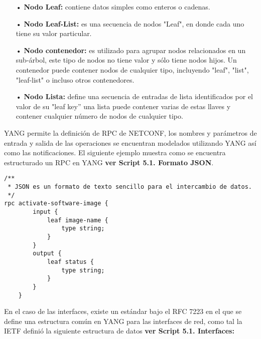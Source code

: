 \begin{itemize}
\item[•] \textbf{Nodo Leaf:} contiene datos simples como enteros o cadenas.
\item[•] \textbf{Nodo Leaf-List:}  es una secuencia de nodos "Leaf", en donde cada uno tiene su valor particular.
\item[•]\textbf{Nodo contenedor:} es utilizado para agrupar nodos relacionados en un sub-árbol, este tipo de nodos no tiene valor y sólo tiene nodos hijos. Un contenedor puede contener nodos de cualquier tipo, incluyendo "leaf", "list", "leaf-list" o incluso otros contenedores.
\item[•] \textbf{Nodo Lista:} define una secuencia de entradas de lista identificados por el valor de su "leaf key” una lista puede contener varias de estas llaves y contener cualquier número de nodos de cualquier tipo.
\end{itemize}
YANG permite la definición de RPC de NETCONF, los nombres y parámetros de entrada y salida de las operaciones se encuentran modelados utilizando YANG así como las notificaciones. El siguiente ejemplo muestra como se encuentra estructurado un RPC en YANG \textbf{ver Script 5.1. Formato JSON}.


\lstset{language=java, caption=RPC Estructura en YANG, label=lst:YANG}
\begin{lstlisting}
/** 
 * JSON es un formato de texto sencillo para el intercambio de datos.  
 */
rpc activate-software-image {
        input {
            leaf image-name {
                type string;
            }
        }
        output {
            leaf status {
                type string;
            }
        }
    }
\end{lstlisting}
En el caso de las interfaces, existe un estándar bajo el RFC 7223 en el que se define una estructura común en YANG para las interfaces de red, como tal la IETF definió la siguiente estructura de datos \textbf{ver Script 5.1. Interfaces:}

